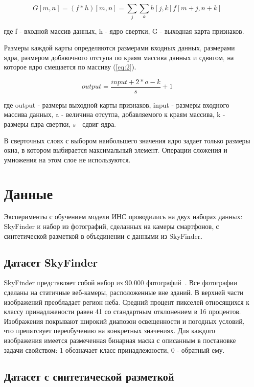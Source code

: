 \begin{equation} 
\label{eq:1}
G[m, n] = (f*h)[m, n] = \sum_{j}{\sum_{k}{h[j, k]f[m + j, n + k]}}
\end{equation}

где f - входной массив данных, h - ядро свертки, G - выходная карта признаков.

Размеры каждой карты определяются размерами входных данных, размерами ядра, размером добавочного отступа по краям массива данных и сдвигом, на которое ядро смещается по массиву (\ref{eq:2}). 

\begin{equation}
\label{eq:2}
output = \frac{input + 2 * a - k}{s} + 1
\end{equation}

где output - размеры выходной карты признаков, input - размеры входного массива данных, a - величина отсутпа, добавляемого к краям массива, k - размеры ядра свертки, s - сдвиг ядра.

В сверточных слоях с выбором наибольшего значения ядро задает только размеры окна, в котором выбирается максимальный элемент. Операции сложения и умножения на этом слое не используются. 

\section{Данные}

Эксперименты с обучением модели ИНС проводились на двух наборах данных: SkyFinder и набор из фотографий, сделанных на камеры смартфонов, с синтетической разметкой в объединении с данными из SkyFinder. 

\subsection{Датасет SkyFinder}

SkyFinder представляет собой набор из 90.000 фотографий~\autocite{mihail2016sky}. Все фотографии сделаны на статичные веб-камеры, расположенные вне зданий. В верхней части изображений преобладает регион неба. Средний процент пикселей относящихся к классу принадлжености равен 41 со стандартным отклонением в 16 процентов. Изображения покрывают широкий диапозон освещенности и погодных условий, что препятсвует переобучению на конкретных значениях. Для каждого изображения имеется размеченная бинарная маска с описанным в постановке задачи свойством: 1 обозначает класс принадлежности, 0 - обратный ему. 

\subsection{Датасет с синтетической разметкой}



